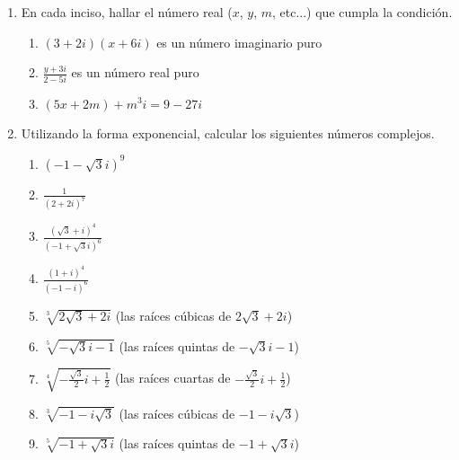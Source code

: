 \documentclass[a4paper]{article}
\newcommand{\exercise}{\item}
\newcommand{\df}[2]{\displaystyle\frac{#1}{#2}}
\newcommand{\conj}[1]{\overline{#1}}
\begin{document}
\begin{enumerate}
\begin{multicols}{2}
\begin{enumerate} [label=(\alph*)]
		\item $Im(z.\conj{z})=0$
		\item $\df{z}{i}=-i.z$
		\item $\conj{i.z}=-i.\conj{z}$
		\item $z.\conj{z}=|z|^2$
		\item $\conj{z-w}=\conj{z}-\conj{w}$
		\item $|z.(1+2i)|^2=(|z|.|3+4i|)^2$
		\item $z+\conj{z} \in \mathbb{R}$
		\item $z-\conj{z} \not\in \mathbb{R}$
	\end{enumerate}
	\end{multicols}
	\exercise En cada inciso, hallar el número real ($x$, $y$, $m$, etc...) que cumpla la condición.
	\begin{enumerate} [label=(\alph*)]
		\item $(3+2i)(x+6i)$ es un número imaginario puro
		\item $\df{y+3i}{2-5i}$ es un número real puro
		\item $(5x+2m)+m^3i = 9-27i$
	\end{enumerate}
	\exercise Utilizando la forma exponencial, calcular los siguientes números complejos.
	\begin{multicols}{2}
	\begin{enumerate} [label=(\alph*)]
		\item $(-1-\sqrt{3}i)^9$
		\item $\df{1}{(2+2i)^7}$
		\item $\df{(\sqrt{3}+i)^4}{(-1+\sqrt{3}i)^6}$
		\item $\df{(1+i)^4}{(-1-i)^6}$
		\item $\sqrt[3]{2\sqrt{3}+2i}$ (las raíces cúbicas de $2\sqrt{3}+2i$)
		\item $\sqrt[5]{-\sqrt{3}i-1}$ (las raíces quintas de $-\sqrt{3}i-1$)
		\item $\sqrt[4]{-\df{\sqrt{3}}{2}i+\df{1}{2}}$ (las raíces cuartas de $-\df{\sqrt{3}}{2}i+\df{1}{2}$)
		\item $\sqrt[3]{-1-i\sqrt{3}}$ (las raíces cúbicas de $-1-i\sqrt{3}$)
		\item $\sqrt[5]{-1+\sqrt{3}i}$ (las raíces quintas de $-1+\sqrt{3}i$)
	\end{enumerate}

\end{multicols}
\end{enumerate}
\end{document}
